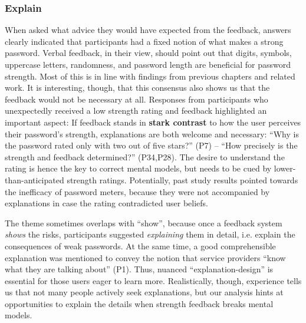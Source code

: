 \subsubsection{Explain}
When asked what advice they would have expected from the feedback, answers clearly indicated that participants had a fixed notion of what makes a strong password. Verbal feedback, in their view, should point out that digits, symbols, uppercase letters, randomness, and password length are beneficial for password strength. Most of this is in line with findings from previous chapters and related work. It is interesting, though, that this consensus also shows us that the feedback would not be necessary at all. Responses from participants who unexpectedly received a low strength rating and feedback highlighted an important aspect: If feedback stands in \textbf{stark contrast} to how the user perceives their password's strength, explanations are both welcome and necessary: ``Why is the password rated only with two out of five stars?'' (P7) -- ``How precisely is the strength and feedback determined?'' (P34,P28). The desire to understand the rating is hence the key to correct mental models, but needs to be cued by lower-than-anticipated strength ratings. Potentially, past study results pointed towards the inefficacy of password meters, because they were not accompanied by explanations in case the rating contradicted user beliefs. 

The theme sometimes overlaps with ``show'', because once a feedback system \textit{shows} the risks, participants suggested \textit{explaining} them in detail, i.e. explain the consequences of weak passwords. At the same time, a good comprehensible explanation was mentioned to convey the notion that service providers ``know what they are talking about'' (P1). Thus, nuanced ``explanation-design'' is essential for those users eager to learn more. Realistically, though, experience tells us that not many people actively seek explanations, but our analysis hints at opportunities to explain the details when strength feedback breaks mental models.



